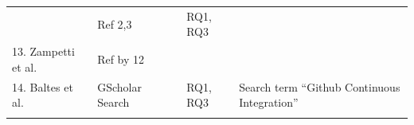 \documentclass[]{book}
\begin{document}
\begin{longtable}[]{@{}lllll@{}}
\begin{minipage}[t]{0.18\columnwidth}
\end{minipage} & \begin{minipage}[t]{0.17\columnwidth}\raggedright\strut
Ref 2,3\strut
\end{minipage} & \begin{minipage}[t]{0.26\columnwidth}\raggedright\strut
\citet{vassallo2018break}\strut
\end{minipage} & \begin{minipage}[t]{0.05\columnwidth}\raggedright\strut
RQ1, RQ3\strut
\end{minipage} & \begin{minipage}[t]{0.19\columnwidth}\raggedright\strut
\strut
\end{minipage}\tabularnewline
\begin{minipage}[t]{0.18\columnwidth}\raggedright\strut
13. Zampetti et al.\strut
\end{minipage} & \begin{minipage}[t]{0.17\columnwidth}\raggedright\strut
Ref by 12\strut
\end{minipage} & \begin{minipage}[t]{0.26\columnwidth}\raggedright\strut
\citet{zampetti2017open}\strut
\end{minipage} & \begin{minipage}[t]{0.05\columnwidth}\raggedright\strut
\strut
\end{minipage} & \begin{minipage}[t]{0.19\columnwidth}\raggedright\strut
\strut
\end{minipage}\tabularnewline
\begin{minipage}[t]{0.18\columnwidth}\raggedright\strut
14. Baltes et al.\strut
\end{minipage} & \begin{minipage}[t]{0.17\columnwidth}\raggedright\strut
GScholar Search\strut
\end{minipage} & \begin{minipage}[t]{0.26\columnwidth}\raggedright\strut
\citet{baltes2018no}\strut
\end{minipage} & \begin{minipage}[t]{0.05\columnwidth}\raggedright\strut
RQ1, RQ3\strut
\end{minipage} & \begin{minipage}[t]{0.19\columnwidth}\raggedright\strut
Search term ``Github Continuous Integration''\strut
\end{minipage}\tabularnewline
\begin{minipage}[t]{0.18\columnwidth}\raggedright\strut

\end{minipage}
\end{longtable}
\end{document}
